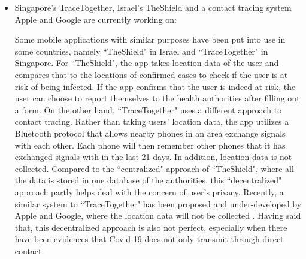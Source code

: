 \begin{itemize}
\begin{itemize}
          \item Singapore's TraceTogether, Israel's TheShield and a contact tracing system Apple and Google are currently working on:
          \par Some mobile applications with similar purposes have been put into use in some countries, namely ``TheShield" in Israel \parencite{IsraelTheShield} and ``TraceTogether" \parencite{SingTraceTogether} in Singapore. For ``TheShield", the app takes location data of the user and compares that to the locations of confirmed cases to check if the user is at risk of being infected. If the app confirms that the user is indeed at risk, the user can choose to report themselves to the health authorities after filling out a form. On the other hand, ``TraceTogether" uses a different approach to contact tracing. Rather than taking users' location data, the app utilizes a Bluetooth protocol that allows nearby phones in an area exchange signals with each other. Each phone will then remember other phones that it has exchanged signals with in the last 21 days. In addition, location data is not collected. Compared to the ``centralized" approach of ``TheShield", where all the data is stored in one database of the authorities, this ``decentralized" approach partly helps deal with the concern of user's privacy. Recently, a similar system to ``TraceTogether" has been proposed and under-developed by Apple and Google, where the location data will not be collected \parencite{AppleGoogleSys}. Having said that, this decentralized approach is also not perfect, especially when there have been evidences that Covid-19 does not only transmit through direct contact.


\end{itemize}
\end{itemize}
